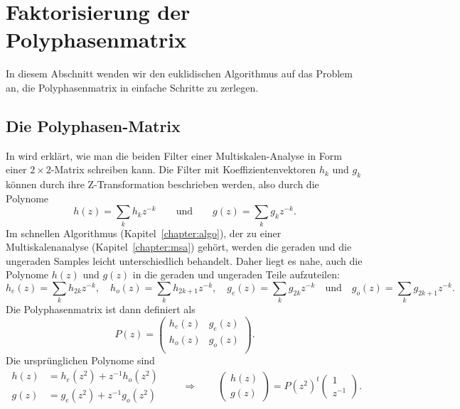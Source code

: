 %
%
\section{Faktorisierung der Polyphasenmatrix}
In diesem Abschnitt wenden wir den euklidischen Algorithmus auf das
Problem an, die Polyphasenmatrix in einfache Schritte zu zerlegen.

\subsection{Die Polyphasen-Matrix}
In \cite{fpga:Daubechies1998} wird erklärt, wie man die beiden
Filter einer Multiskalen-Analyse in Form einer $2\times 2$-Matrix
schreiben kann.
Die Filter mit Koeffizientenvektoren $h_k$ und $g_k$ können durch 
ihre Z-Transformation beschrieben werden, also durch die Polynome
\[
h(z) = \sum_{k} h_kz^{-k}
\qquad\text{und}\qquad
g(z) = \sum_{k} g_kz^{-k}.
\]
Im schnellen Algorithmus (Kapitel~\ref{chapter:algo}), der zu einer
Multiskalenanalyse (Kapitel~\ref{chapter:msa}) gehört, werden die
geraden und die ungeraden Samples leicht unterschiedlich behandelt.
Daher liegt es nahe, auch die Polynome $h(z)$ und $g(z)$ in die
geraden und ungeraden Teile aufzuteilen:
\[
h_e(z) = \sum_k h_{2k}z^{-k},
\quad
h_o(z) = \sum_k h_{2k+1}z^{-k},
\quad
g_e(z) = \sum_k g_{2k}z^{-k}
\quad\text{und}\quad
g_o(z) = \sum_k g_{2k+1}z^{-k}.
\]
Die Polyphasenmatrix ist dann definiert als
\[
P(z)
=
\begin{pmatrix}
h_e(z)&g_e(z)\\
h_o(z)&g_o(z)\\
\end{pmatrix}.
\]
Die ursprünglichen Polynome sind
\[
\begin{aligned}
h(z) &= h_e(z^2) + z^{-1}h_o(z^2)\\
g(z) &= g_e(z^2) + z^{-1}g_o(z^2)
\end{aligned}
\qquad\Rightarrow\qquad
\begin{pmatrix}
h(z)\\
g(z)
\end{pmatrix}
=
P(z^2)^t
\begin{pmatrix} 1\\ z^{-1} \end{pmatrix}.
\]

